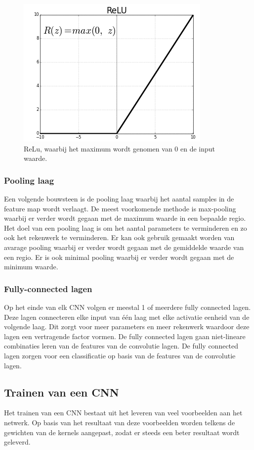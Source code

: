 \begin{figure}[!ht]
 	\centering
 	\includegraphics[width=0.35\linewidth]{fig/ReLu.png}
 	\caption{ReLu, waarbij het maximum wordt genomen van 0 en de input waarde.}
 	\label{fig:relu}
\end{figure}

\subsubsection{Pooling laag}
Een volgende bouwsteen is de pooling laag waarbij het aantal samples in de feature map wordt verlaagt. De meest voorkomende methode is max-pooling waarbij er verder wordt gegaan met de maximum waarde in een bepaalde regio. Het doel van een pooling laag is om het aantal parameters te verminderen en zo ook het rekenwerk te verminderen. Er kan ook gebruik gemaakt worden van avarage pooling waarbij er verder wordt gegaan met de gemiddelde waarde van een regio. Er is ook minimal pooling waarbij er verder wordt gegaan met de minimum waarde.

\subsubsection{Fully-connected lagen}
Op het einde van elk CNN volgen er meestal 1 of meerdere fully connected lagen. Deze lagen connecteren elke input van \'e\'en laag met elke activatie eenheid van de volgende laag. Dit zorgt voor meer parameters en meer rekenwerk waardoor deze lagen een vertragende factor vormen. De fully connected lagen gaan niet-lineare combinaties leren van de features van de convolutie lagen. De fully connected lagen zorgen voor een classificatie op basis van de features van de convolutie lagen.

\subsection{Trainen van een CNN}
Het trainen van een CNN bestaat uit het leveren van veel voorbeelden aan het netwerk. Op basis van het resultaat van deze voorbeelden worden telkens de gewichten van de kernels aangepast, zodat er steeds een beter resultaat wordt geleverd. 

